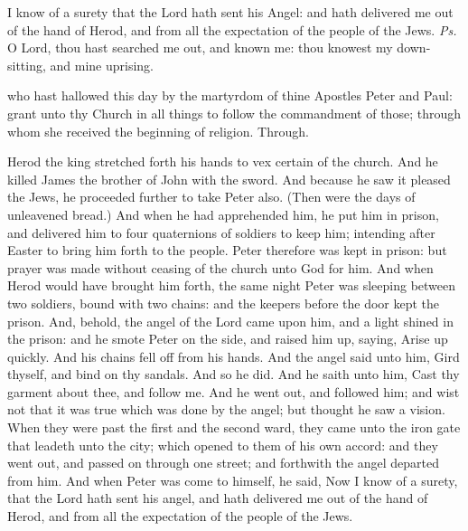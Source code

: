 
\introit
{} I know of a surety that the Lord hath sent his Angel: and hath delivered me out of the hand of Herod, and from all the expectation of the people of the Jews. \textit{Ps.} O Lord, thou hast searched me out, and known me: thou knowest my down-sitting, and mine uprising.

\collect
{} who hast hallowed this day by the martyrdom of thine Apostles Peter and Paul: grant unto thy Church in all things to follow the commandment of those; through whom she received the beginning of religion. Through.


 Herod the king stretched forth his hands to vex certain of the church. And he killed James the brother of John with the sword. And because he saw it pleased the Jews, he proceeded further to take Peter also. (Then were the days of unleavened bread.) And when he had apprehended him, he put him in prison, and delivered him to four quaternions of soldiers to keep him; intending after Easter to bring him forth to the people. Peter therefore was kept in prison: but prayer was made without ceasing of the church unto God for him. And when Herod would have brought him forth, the same night Peter was sleeping between two soldiers, bound with two chains: and the keepers before the door kept the prison. And, behold, the angel of the Lord came upon him, and a light shined in the prison: and he smote Peter on the side, and raised him up, saying, Arise up quickly. And his chains fell off from his hands. And the angel said unto him, Gird thyself, and bind on thy sandals. And so he did. And he saith unto him, Cast thy garment about thee, and follow me. And he went out, and followed him; and wist not that it was true which was done by the angel; but thought he saw a vision. When they were past the first and the second ward, they came unto the iron gate that leadeth unto the city; which opened to them of his own accord: and they went out, and passed on through one street; and forthwith the angel departed from him. And when Peter was come to himself, he said, Now I know of a surety, that the Lord hath sent his angel, and hath delivered me out of the hand of Herod, and from all the expectation of the people of the Jews.

